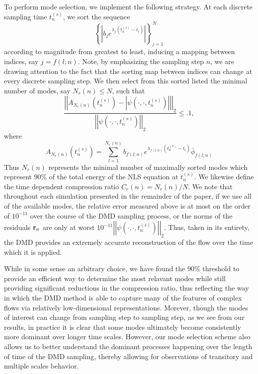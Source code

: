 \documentclass[aps,prl,preprint,groupedaddress]{revtex4-1}
\newcommand{\gnorm}[1]{\left|\left| #1\right|\right|}
\begin{document}
To perform mode selection, we implement the following strategy.  At each discrete sampling time $t^{(s)}_{n}$, we sort the sequence 
\[
\left\{ \left|  b_{j}e^{\lambda_{j}(t_{n}^{(s)}-t_{i})} \right| \right\}_{j=1}^{N}
\]
according to magnitude from greatest to least, inducing a mapping between indices, say $j=f(l;n)$.  Note, by emphasizing the sampling step $n$, we are drawing attention to the fact that the sorting map between indices can change at every discrete sampling step.  We then select from this sorted listed the minimal number of modes, say $N_{r}(n)\leq N$, such that 
\[
\frac{\gnorm{A_{N_{r}(n)}\left(t^{(s)}_{n}\right) - \left|\psi(\cdot,\cdot,t^{(s)}_{n})\right|}_{2}}{\gnorm{\psi(\cdot,\cdot,t^{(s)}_{n})}_{2}} \leq .1,
\]
where
\[
A_{N_{r}(n)}\left(t^{(s)}_{n}\right) = \sum_{l=1}^{N_{r}(n)} b_{f(l;n)}e^{\lambda_{f(l;n)}(t^{(s)}_{n}-t_{i})} \bar{\phi}_{f(l;n)}
\]
Thus $N_{r}(n)$ represents the minimal number of maximally sorted modes which represent $90\%$ of the total energy of the NLS equation at $t^{(s)}_{n}$.  We likewise define the time dependent compression ratio $C_{r}(n)=N_{r}(n)/N$.  We note that throughout each simulation presented in the remainder of the paper, if we use all of the available modes, the relative error measured above is at most on the order of $10^{-11}$ over the course of the DMD sampling process, or the norms of the residuals ${\bf r}_{n}$ are only at worst $10^{-11}\gnorm{\psi(\cdot,\cdot,t^{(s)}_{n})}_{2}$.  Thus, taken in its entirety, the DMD provides an extremely accurate reconstruction of the flow over the time which it is applied.  

While in some sense an arbitrary choice, we have found the $90\%$ threshold to provide an efficient way to determine the most relavant modes while still providing significant reductions in the compression ratio, thus reflecting the way in which the DMD method is able to capture many of the features of complex flows via relatively low-dimensional representations.  
Morever, though the modes of interest can change from sampling step to sampling step, as we see from our results, in practice it is clear that some modes ultimately become consistently more dominant over longer time scales.  However, our mode selection scheme also allows us to better understand the dominant processes happening over the length of time of the DMD sampling, thereby allowing for observations of transitory and multiple scales behavior.  
\end{document}
